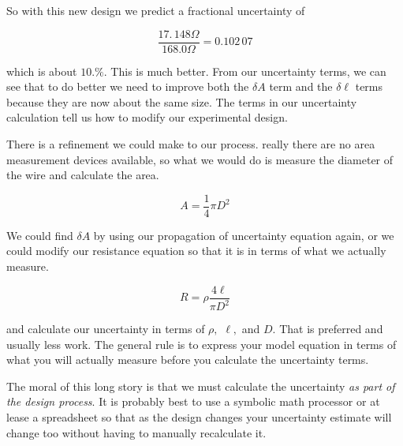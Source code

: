 \noindent So with this new design we predict a fractional uncertainty of

\begin{equation*}
	\frac{17.\,\allowbreak 148\unit{\Omega}}{168.0\unit{\Omega	}}=0.102\,07
\end{equation*}

which is about $\allowbreak 10.\%.$ This is much better. From our uncertainty terms, we can see that to do better we need to improve both the $\delta A$ term and the $\delta \ell $ terms because they are now about the same size. The terms in our uncertainty calculation tell us how to modify our experimental design.

There is a refinement we could make to our process. really there are no area measurement devices available, so what we would do is measure the diameter of the wire and calculate the area.

\begin{equation*}
	A=\frac{1}{4}\pi D^{2}
\end{equation*}

We could find $\delta A$ by using our propagation of uncertainty equation again, or we could modify our resistance equation so that it is in terms of what we actually measure.

\begin{equation*}
	R=\rho \frac{4\ell }{\pi D^{2}}
\end{equation*}

\noindent and calculate our uncertainty in terms of $\rho ,$ $\ell ,$ and $D.$ That is preferred and usually less work. The general rule is to express your model equation in terms of what you will actually measure before you calculate the uncertainty terms.

The moral of this long story is that we must calculate the uncertainty \emph{as part of the design process}. It is probably best to use a symbolic math processor or at lease a spreadsheet so that as the design changes your uncertainty estimate will change too without having to manually recalculate it.


